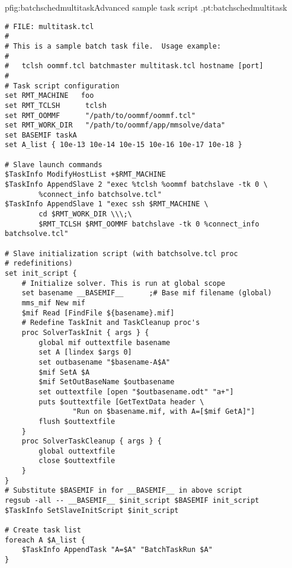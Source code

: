 \begin{codelisting}{p}{fig:batchschedmultitask}{Advanced sample task
script .}{pt:batchschedmultitask}
\begin{verbatim}
# FILE: multitask.tcl
#
# This is a sample batch task file.  Usage example:
#
#   tclsh oommf.tcl batchmaster multitask.tcl hostname [port]
#
# Task script configuration
set RMT_MACHINE   foo 
set RMT_TCLSH      tclsh
set RMT_OOMMF      "/path/to/oommf/oommf.tcl"
set RMT_WORK_DIR   "/path/to/oommf/app/mmsolve/data"
set BASEMIF taskA
set A_list { 10e-13 10e-14 10e-15 10e-16 10e-17 10e-18 }

# Slave launch commands
$TaskInfo ModifyHostList +$RMT_MACHINE
$TaskInfo AppendSlave 2 "exec %tclsh %oommf batchslave -tk 0 \
        %connect_info batchsolve.tcl"
$TaskInfo AppendSlave 1 "exec ssh $RMT_MACHINE \
        cd $RMT_WORK_DIR \\\;\
        $RMT_TCLSH $RMT_OOMMF batchslave -tk 0 %connect_info batchsolve.tcl"

# Slave initialization script (with batchsolve.tcl proc
# redefinitions)
set init_script {
    # Initialize solver. This is run at global scope
    set basename __BASEMIF__      ;# Base mif filename (global)
    mms_mif New mif
    $mif Read [FindFile ${basename}.mif]
    # Redefine TaskInit and TaskCleanup proc's
    proc SolverTaskInit { args } {
        global mif outtextfile basename
        set A [lindex $args 0]
        set outbasename "$basename-A$A"
        $mif SetA $A
        $mif SetOutBaseName $outbasename
        set outtextfile [open "$outbasename.odt" "a+"]
        puts $outtextfile [GetTextData header \
                "Run on $basename.mif, with A=[$mif GetA]"]
        flush $outtextfile
    }
    proc SolverTaskCleanup { args } {
        global outtextfile
        close $outtextfile
    }
}
# Substitute $BASEMIF in for __BASEMIF__ in above script
regsub -all -- __BASEMIF__ $init_script $BASEMIF init_script
$TaskInfo SetSlaveInitScript $init_script

# Create task list
foreach A $A_list {
    $TaskInfo AppendTask "A=$A" "BatchTaskRun $A"
}
\end{verbatim}
\end{codelisting}

\setcounter{secnumdepth}{\value{msoldsecnumdepth}}
